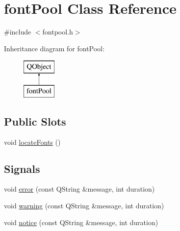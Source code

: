 \hypertarget{classfontPool}{\section{font\+Pool Class Reference}
\label{classfontPool}
}


{\ttfamily \#include $<$fontpool.\+h$>$}

Inheritance diagram for font\+Pool\+:\begin{figure}[H]
\begin{center}
\leavevmode
\includegraphics[height=2.000000cm]{classfontPool}
\end{center}
\end{figure}
\subsection*{Public Slots}
\begin{DoxyCompactItemize}
\item 
void \hyperlink{classfontPool_a46fecbc3b61af504c2327a1df7d76fdd}{locate\+Fonts} ()
\end{DoxyCompactItemize}
\subsection*{Signals}
\begin{DoxyCompactItemize}
\item 
void \hyperlink{classfontPool_a145afc74f19639a06f430f5b46c32de2}{error} (const Q\+String \&message, int duration)
\item 
void \hyperlink{classfontPool_ac5b869c2a60a349b48a2a200076becad}{warning} (const Q\+String \&message, int duration)
\item 
void \hyperlink{classfontPool_a8e52df73be76d4af8d026516b0e3ec56}{notice} (const Q\+String \&message, int duration)
\end{DoxyCompactItemize}
